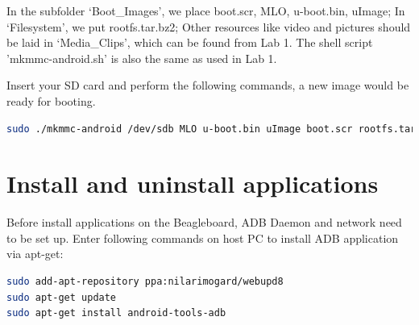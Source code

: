 \documentclass[10pt,journal,draftclsnofoot,onecolumn]{IEEEtran}
\begin{document}
In the subfolder `Boot\_Images', we place boot.scr, MLO, u-boot.bin, uImage; In `Filesystem', we put  rootfs.tar.bz2; Other resources like video and pictures should be laid in `Media\_Clips', which can be found from Lab 1. The shell script 'mkmmc-android.sh' is also the same as used in Lab 1.

Insert your SD card and perform the following commands, a new image would be ready for booting. 
 \begin{lstlisting}[language={bash}]
sudo ./mkmmc-android /dev/sdb MLO u-boot.bin uImage boot.scr rootfs.tar.bz2
\end{lstlisting}

\section{Install and uninstall applications}\label{HdDes}
Before install applications on the Beagleboard, ADB Daemon and network need to be set up.
Enter following commands on host PC to install ADB application via apt-get:
\begin{lstlisting}[language={bash}]
sudo add-apt-repository ppa:nilarimogard/webupd8
sudo apt-get update
sudo apt-get install android-tools-adb
\end{lstlisting}
\end{document}
